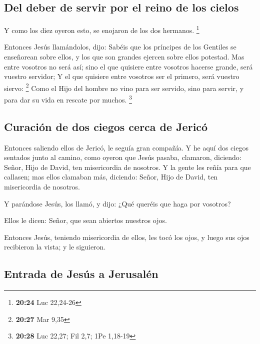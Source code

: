\hypertarget{del-deber-de-servir-por-el-reino-de-los-cielos}{%
\subsection{Del deber de servir por el reino de los
cielos}\label{del-deber-de-servir-por-el-reino-de-los-cielos}}

 Y como los diez oyeron esto, se enojaron de los dos
hermanos. \footnote{\textbf{20:24} Luc 22,24-26}

 Entonces Jesús llamándolos, dijo: Sabéis que los príncipes
de los Gentiles se enseñorean sobre ellos, y los que son grandes ejercen
sobre ellos potestad.  Mas entre vosotros no será así; sino
el que quisiere entre vosotros hacerse grande, será vuestro servidor;
 Y el que quisiere entre vosotros ser el primero, será
vuestro siervo: \footnote{\textbf{20:27} Mar 9,35}  Como el
Hijo del hombre no vino para ser servido, sino para servir, y para dar
su vida en rescate por muchos. \footnote{\textbf{20:28} Luc 22,27; Fil
  2,7; 1Pe 1,18-19}

\hypertarget{curaciuxf3n-de-dos-ciegos-cerca-de-jericuxf3}{%
\subsection{Curación de dos ciegos cerca de
Jericó}\label{curaciuxf3n-de-dos-ciegos-cerca-de-jericuxf3}}

 Entonces saliendo ellos de Jericó, le seguía gran
compañía.  Y he aquí dos ciegos sentados junto al camino,
como oyeron que Jesús pasaba, clamaron, diciendo: Señor, Hijo de David,
ten misericordia de nosotros.  Y la gente les reñía para
que callasen; mas ellos clamaban más, diciendo: Señor, Hijo de David,
ten misericordia de nosotros.

 Y parándose Jesús, los llamó, y dijo: ¿Qué queréis que
haga por vosotros?

 Ellos le dicen: Señor, que sean abiertos nuestros ojos.

 Entonces Jesús, teniendo misericordia de ellos, les tocó
los ojos, y luego sus ojos recibieron la vista; y le siguieron.

\hypertarget{entrada-de-jesuxfas-a-jerusaluxe9n}{%
\subsection{Entrada de Jesús a
Jerusalén}\label{entrada-de-jesuxfas-a-jerusaluxe9n}}

